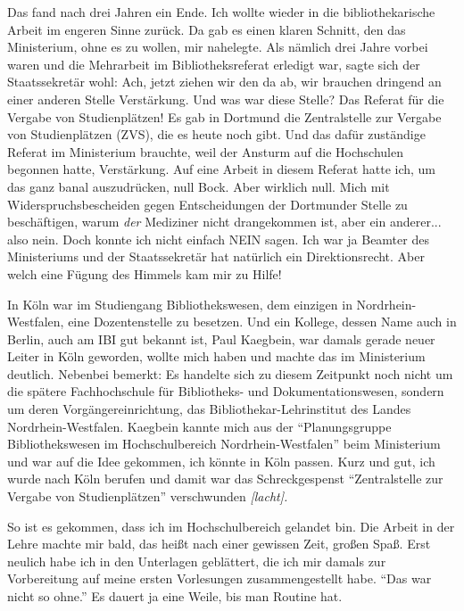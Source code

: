 \documentclass[a4paper,
fontsize=11pt,
oneside,
numbers=noperiodatend,
parskip=half-,
bibliography=totoc,
final
]{scrartcl}
\begin{document}
Das fand nach drei Jahren ein Ende. Ich wollte wieder in die
bibliothekarische Arbeit im engeren Sinne zurück. Da gab es einen klaren
Schnitt, den das Ministerium, ohne es zu wollen, mir nahelegte. Als
nämlich drei Jahre vorbei waren und die Mehrarbeit im Bibliotheksreferat
erledigt war, sagte sich der Staatssekretär wohl: Ach, jetzt ziehen wir
den da ab, wir brauchen dringend an einer anderen Stelle Verstärkung.
Und was war diese Stelle? Das Referat für die Vergabe von
Studienplätzen! Es gab in Dortmund die Zentralstelle zur Vergabe von
Studienplätzen (ZVS), die es heute noch gibt. Und das dafür zuständige
Referat im Ministerium brauchte, weil der Ansturm auf die Hochschulen
begonnen hatte, Verstärkung. Auf eine Arbeit in diesem Referat hatte
ich, um das ganz banal auszudrücken, null Bock. Aber wirklich null. Mich
mit Widerspruchsbescheiden gegen Entscheidungen der Dortmunder Stelle zu
beschäftigen, warum \emph{der} Mediziner nicht drangekommen ist, aber
ein anderer... also nein. Doch konnte ich nicht einfach NEIN sagen. Ich
war ja Beamter des Ministeriums und der Staatssekretär hat natürlich ein
Direktionsrecht. Aber welch eine Fügung des Himmels kam mir zu Hilfe!

In Köln war im Studiengang Bibliothekswesen, dem einzigen in
Nordrhein-Westfalen, eine Dozentenstelle zu besetzen. Und ein Kollege,
dessen Name auch in Berlin, auch am IBI gut bekannt ist, Paul Kaegbein,
war damals gerade neuer Leiter in Köln geworden, wollte mich haben und
machte das im Ministerium deutlich. Nebenbei bemerkt: Es handelte sich
zu diesem Zeitpunkt noch nicht um die spätere Fachhochschule für
Bibliotheks- und Dokumentationswesen, sondern um deren
Vorgängereinrichtung, das Bibliothekar-Lehrinstitut des Landes
Nordrhein-Westfalen. Kaegbein kannte mich aus der
\enquote{Planungsgruppe Bibliothekswesen im Hochschulbereich
Nordrhein-Westfalen} beim Ministerium und war auf die Idee gekommen, ich
könnte in Köln passen. Kurz und gut, ich wurde nach Köln berufen und
damit war das Schreckgespenst \enquote{Zentralstelle zur Vergabe von
Studienplätzen} verschwunden \emph{{[}lacht{]}.}

So ist es gekommen, dass ich im Hochschulbereich gelandet bin. Die
Arbeit in der Lehre machte mir bald, das heißt nach einer gewissen Zeit,
großen Spaß. Erst neulich habe ich in den Unterlagen geblättert, die ich
mir damals zur Vorbereitung auf meine ersten Vorlesungen
zusammengestellt habe. \enquote{Das war nicht so ohne.} Es dauert ja
eine Weile, bis man Routine hat.
\end{document}
